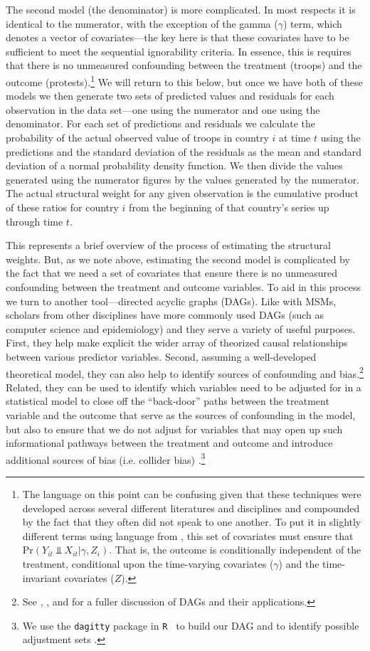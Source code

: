 The second model (the denominator) is more complicated. In most respects it is identical to the numerator, with the exception of the gamma ($\gamma$) term, which denotes a vector of covariates---the key here is that these covariates have to be sufficient to meet the sequential ignorability criteria. In essence, this is requires that there is no unmeasured confounding between the treatment (troops) and the outcome (protests).\footnote{The language on this point can be confusing given that these techniques were developed across several different literatures and disciplines and compounded by the fact that they often did not speak to one another. To put it in slightly different terms using language from , this set of covariates must ensure that Pr$ (Y_{it} \Perp X_{it} | \gamma, Z_{i}) $. That is, the outcome is conditionally independent of the treatment, conditional upon the time-varying covariates ($\gamma$) and the time-invariant covariates ($Z$).} We will return to this below, but once we have both of these models we then generate two sets of predicted values and residuals for each observation in the data set---one using the numerator and one using the denominator. For each set of predictions and residuals we calculate the probability of the actual observed value of troops in country $i$ at time $t$ using the predictions and the standard deviation of the residuals as the mean and standard deviation of a normal probability density function. We then divide the values generated using the numerator figures by the values generated by the numerator. The actual structural weight for any given observation is the cumulative product of these ratios for country $i$ from the beginning of that country's series up through time $t$. 

This represents a brief overview of the process of estimating the structural weights. But, as we note above, estimating the second model is complicated by the fact that we need a set of covariates that ensure there is no unmeasured confounding between the treatment and outcome variables. To aid in this process we turn to another tool---directed acyclic graphs (DAGs). Like with MSMs, scholars from other disciplines have more commonly used DAGs (such as computer science and epidemiology) and they serve a variety of useful purposes. First, they help make explicit the wider array of theorized causal relationships between various predictor variables. Second, assuming a well-developed theoretical model, they can also help to identify sources of confounding and bias.\footnote{See , , and  for a fuller discussion of DAGs and their applications.} Related, they can be used to identify which variables need to be adjusted for in a statistical model to close off the ``back-door'' paths between the treatment variable and the outcome that serve as the sources of confounding in the model, but also to ensure that we do not adjust for variables that may open up such informational pathways between the treatment and outcome and introduce additional sources of bias (i.e. collider bias) \cite{Pearl2009}.\footnote{We use the {\tt dagitty} package in {\tt R } to build our DAG and to identify possible adjustment sets \cite{Textoretal2016}.}

